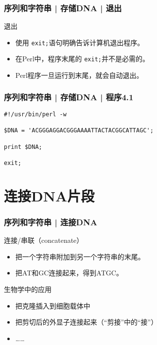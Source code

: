 \begin{frame}[fragile]
  \frametitle{序列和字符串 | 存储DNA | \alert{退出}}
  \begin{block}{退出}
    \begin{itemize}
      \item 使用 \verb|exit;|语句明确告诉计算机退出程序。
      \item 在Perl中，程序末尾的 \verb|exit;|并不是必需的。
      \item Perl程序一旦运行到末尾，就会自动退出。
    \end{itemize}
  \end{block}
\end{frame}

\begin{frame}[fragile]
  \frametitle{序列和字符串 | 存储DNA | 程序4.1}
\begin{lstlisting}
#!/usr/bin/perl -w

$DNA = 'ACGGGAGGACGGGAAAATTACTACGGCATTAGC';

print $DNA;

exit;
\end{lstlisting}
\end{frame}


\section{连接DNA片段}
\begin{frame}
  \frametitle{序列和字符串 | 连接DNA}
  \begin{block}{连接/串联（concatenate）}
    \begin{itemize}
      \item 把一个字符串附加到另一个字符串的末尾。
      \item 把AT和GC连接起来，得到ATGC。
    \end{itemize}
  \end{block}
  \pause
  \begin{block}{生物学中的应用}
    \begin{itemize}
      \item 把克隆插入到细胞载体中
      \item 把剪切后的外显子连接起来（“剪接”中的“接”）
      \item ……
    \end{itemize}
  \end{block}
\end{frame}

